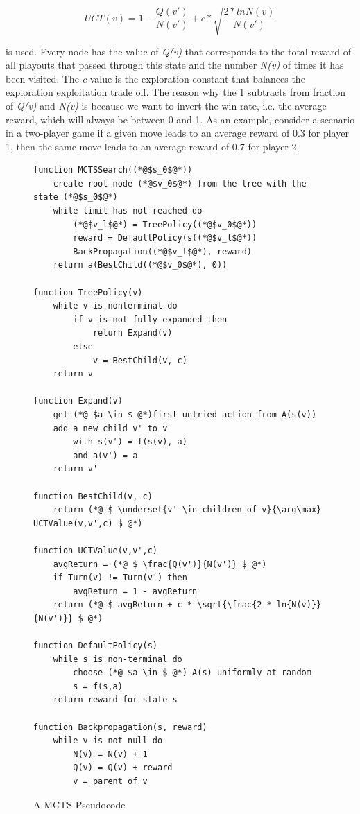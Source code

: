 \[ UCT(v) = 1 - \frac{Q(v')}{N(v')} + c*\sqrt{\frac{2 * ln{N(v)}}{N(v')}} \]

is used. Every node has the value of \textit{Q(v)} that corresponds to the total reward of all playouts that passed through this state and the number \textit{N(v)} of times it has been visited. The \textit{c} value is the exploration constant that balances the exploration exploitation trade off. The reason why the 1 subtracts from fraction of \textit{Q(v)} and \textit{N(v)} is because we want to invert the win rate, i.e. the average reward, which will always be between 0 and 1. As an example, consider a scenario in a two-player game if a given move leads to an average reward of 0.3 for player 1, then the same move leads to an average reward of 0.7 for player 2. 

\begin{figure}
\captionsetup{justification=centering}
\begin{lstlisting}
function MCTSSearch((*@$s_0$@*))
    create root node (*@$v_0$@*) from the tree with the state (*@$s_0$@*)
    while limit has not reached do
        (*@$v_l$@*) = TreePolicy((*@$v_0$@*))
        reward = DefaultPolicy(s((*@$v_l$@*))
        BackPropagation((*@$v_l$@*), reward)
    return a(BestChild((*@$v_0$@*), 0))
	
function TreePolicy(v)
    while v is nonterminal do 
        if v is not fully expanded then
            return Expand(v)
        else
            v = BestChild(v, c)
    return v

function Expand(v)
    get (*@ $a \in $ @*)first untried action from A(s(v))
    add a new child v' to v
        with s(v') = f(s(v), a) 
        and a(v') = a
    return v'
	
function BestChild(v, c)
    return (*@ $ \underset{v' \in children of v}{\arg\max} UCTValue(v,v',c) $ @*)
	
function UCTValue(v,v',c)
    avgReturn = (*@ $ \frac{Q(v')}{N(v')} $ @*)
    if Turn(v) != Turn(v') then 
        avgReturn = 1 - avgReturn
    return (*@ $ avgReturn + c * \sqrt{\frac{2 * ln{N(v)}}{N(v')}} $ @*)
	
function DefaultPolicy(s)
    while s is non-terminal do
        choose (*@ $a \in $ @*) A(s) uniformly at random
        s = f(s,a)
    return reward for state s

function Backpropagation(s, reward)
    while v is not null do
        N(v) = N(v) + 1
        Q(v) = Q(v) + reward
        v = parent of v
\end{lstlisting}
\caption{A MCTS Pseudocode}
\label{fig:mctsREST}
\end{figure}


